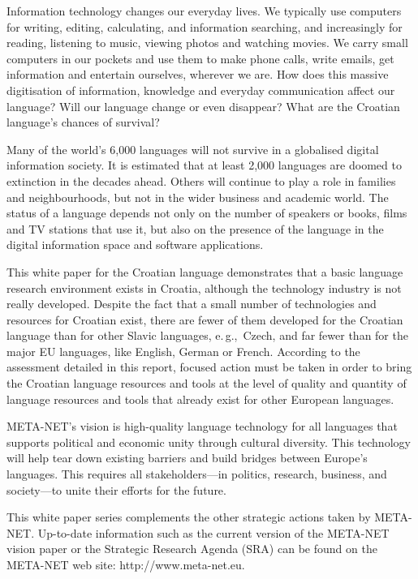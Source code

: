 \cleardoublepage



\begin{multicols}{2}

Information technology changes our everyday lives. We typically use computers for writing, editing, calculating, and information searching, and increasingly for reading, listening to music, viewing photos and watching movies. We carry small computers in our pockets and use them to make phone calls, write emails, get information and entertain ourselves, wherever we are. How does this massive digitisation of information, knowledge and everyday communication affect our language? Will our language change or even disappear? What are the Croatian language’s chances of survival? 

Many of the world’s 6,000 languages will not survive in a globalised digital information society. It is estimated that at least 2,000 languages are doomed to extinction in the decades ahead. Others will continue to play a role in families and neighbourhoods, but not in the wider business and academic world. The status of a language depends not only on the number of speakers or books, films and TV stations that use it, but also on the presence of the language in the digital information space and software applications. 

This white paper for the Croatian language demonstrates that a basic language research environment exists in Croatia, although the technology industry is not really developed. Despite the fact that a small number of technologies and resources for Croatian exist, there are fewer of them developed for the Croatian language than for other Slavic languages, e.\,g.,~Czech, and far fewer than for the major EU languages, like English, German or French. According to the assessment detailed in this report, focused action must be taken in order to bring the Croatian language resources and tools at the level of quality and quantity of language resources and tools that already exist for other European languages.

META-NET’s vision is high-quality language technology for all languages that supports political and economic unity through cultural diversity. This technology will help tear down existing barriers and build bridges between Europe’s languages. This requires all stakeholders—in politics, research, business, and society—to unite their efforts for the future.

This white paper series complements the other strategic actions taken by META-NET. Up-to-date information such as the current version of the META-NET vision paper \cite{str1} or the Strategic Research Agenda (SRA) can be found on the META-NET web site: http://www.meta-net.eu.
\end{multicols}
\clearpage

